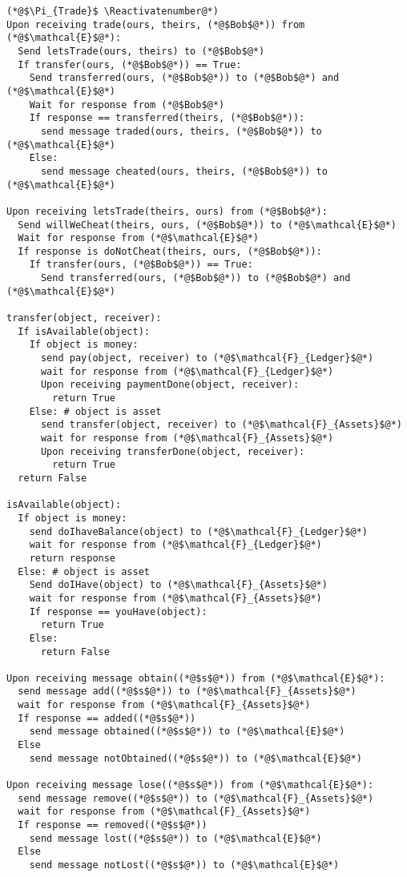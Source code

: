 \Suppressnumber
\begin{lstlisting}[label=tradeprot, style=numbers]
(*@$\Pi_{Trade}$ \Reactivatenumber@*)
Upon receiving trade(ours, theirs, (*@$Bob$@*)) from (*@$\mathcal{E}$@*):
  Send letsTrade(ours, theirs) to (*@$Bob$@*)
  If transfer(ours, (*@$Bob$@*)) == True:
    Send transferred(ours, (*@$Bob$@*)) to (*@$Bob$@*) and (*@$\mathcal{E}$@*)
    Wait for response from (*@$Bob$@*)
    If response == transferred(theirs, (*@$Bob$@*)):
      send message traded(ours, theirs, (*@$Bob$@*)) to (*@$\mathcal{E}$@*)
    Else:
      send message cheated(ours, theirs, (*@$Bob$@*)) to (*@$\mathcal{E}$@*)

Upon receiving letsTrade(theirs, ours) from (*@$Bob$@*):
  Send willWeCheat(theirs, ours, (*@$Bob$@*)) to (*@$\mathcal{E}$@*)
  Wait for response from (*@$\mathcal{E}$@*)
  If response is doNotCheat(theirs, ours, (*@$Bob$@*)):
    If transfer(ours, (*@$Bob$@*)) == True:
      Send transferred(ours, (*@$Bob$@*)) to (*@$Bob$@*) and (*@$\mathcal{E}$@*)

transfer(object, receiver):
  If isAvailable(object):
    If object is money:
      send pay(object, receiver) to (*@$\mathcal{F}_{Ledger}$@*)
      wait for response from (*@$\mathcal{F}_{Ledger}$@*)
      Upon receiving paymentDone(object, receiver):
        return True
    Else: # object is asset
      send transfer(object, receiver) to (*@$\mathcal{F}_{Assets}$@*)
      wait for response from (*@$\mathcal{F}_{Assets}$@*)
      Upon receiving transferDone(object, receiver):
        return True
  return False

isAvailable(object):
  If object is money:
    send doIhaveBalance(object) to (*@$\mathcal{F}_{Ledger}$@*)
    wait for response from (*@$\mathcal{F}_{Ledger}$@*)
    return response
  Else: # object is asset
    Send doIHave(object) to (*@$\mathcal{F}_{Assets}$@*)
    wait for response from (*@$\mathcal{F}_{Assets}$@*)
    If response == youHave(object):
      return True
    Else:
      return False

Upon receiving message obtain((*@$s$@*)) from (*@$\mathcal{E}$@*):
  send message add((*@$s$@*)) to (*@$\mathcal{F}_{Assets}$@*)
  wait for response from (*@$\mathcal{F}_{Assets}$@*)
  If response == added((*@$s$@*))
    send message obtained((*@$s$@*)) to (*@$\mathcal{E}$@*)
  Else
    send message notObtained((*@$s$@*)) to (*@$\mathcal{E}$@*)

Upon receiving message lose((*@$s$@*)) from (*@$\mathcal{E}$@*):
  send message remove((*@$s$@*)) to (*@$\mathcal{F}_{Assets}$@*)
  wait for response from (*@$\mathcal{F}_{Assets}$@*)
  If response == removed((*@$s$@*))
    send message lost((*@$s$@*)) to (*@$\mathcal{E}$@*)
  Else
    send message notLost((*@$s$@*)) to (*@$\mathcal{E}$@*)
\end{lstlisting}
